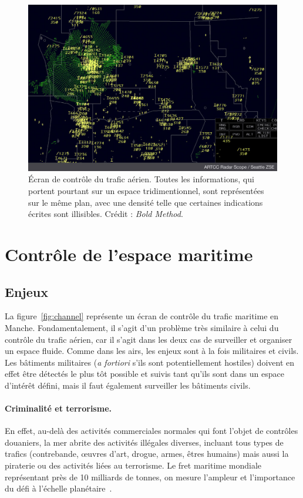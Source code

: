 	\begin{figure}[H]
		\centering
		\includegraphics[width=\textwidth]{figures/Radar-Scope-ZSE}
		\caption{Écran de contrôle du trafic aérien. Toutes les informations, qui portent pourtant sur un espace tridimentionnel, sont représentées sur le même plan, avec une densité telle que certaines indications écrites sont illisibles. Crédit : \emph{Bold Method}.}
		\label{fig:airtraffic}
	\end{figure}
	
	\section{Contrôle de l'espace maritime}
	\subsection{Enjeux}
	La figure~\ref{fig:channel} représente un écran de contrôle du trafic maritime en Manche. Fondamentalement, il s'agit d'un problème très similaire à celui du contrôle du trafic aérien, car il s'agit dans les deux cas de surveiller et organiser un espace fluide. Comme dans les airs, les enjeux sont à la fois militaires et civils. Les bâtiments militaires (\emph{a fortiori} s'ils sont potentiellement hostiles) doivent en effet être détectés le plus tôt possible et suivis tant qu'ils sont dans un espace d'intérêt défini, mais il faut également surveiller les bâtiments civils.
	
	\paragraph{Criminalité et terrorisme.}
	En effet, au-delà des activités commerciales normales qui font l'objet de contrôles douaniers, la mer abrite des activités illégales diverses, incluant tous types de trafics (contrebande, œuvres d'art, drogue, armes, êtres humains) mais aussi la piraterie ou des activités liées au terrorisme.
	Le fret maritime mondiale représentant près de 10 milliards de tonnes, on mesure l'ampleur et l'importance du défi à l'échelle planétaire~\cite{unctad}.
	
